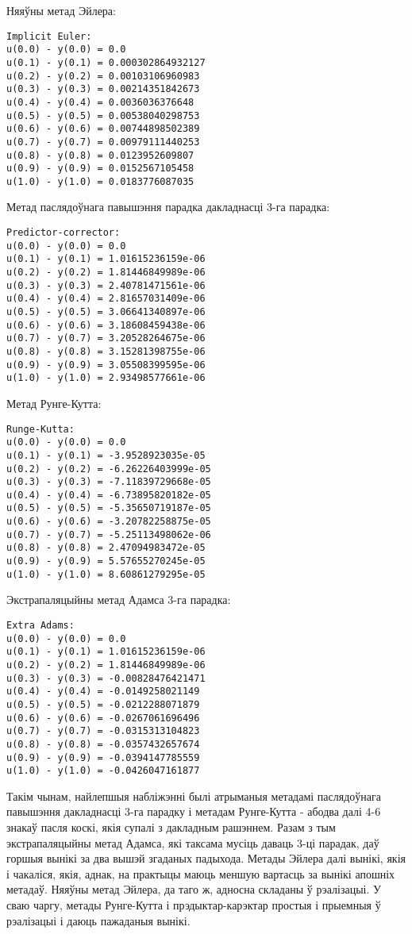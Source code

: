 Няяўны метад Эйлера:
{\small
\begin{verbatim}
Implicit Euler:
u(0.0) - y(0.0) = 0.0
u(0.1) - y(0.1) = 0.000302864932127
u(0.2) - y(0.2) = 0.00103106960983
u(0.3) - y(0.3) = 0.00214351842673
u(0.4) - y(0.4) = 0.0036036376648
u(0.5) - y(0.5) = 0.00538040298753
u(0.6) - y(0.6) = 0.00744898502389
u(0.7) - y(0.7) = 0.00979111440253
u(0.8) - y(0.8) = 0.0123952609807
u(0.9) - y(0.9) = 0.0152567105458
u(1.0) - y(1.0) = 0.0183776087035
\end{verbatim}
}

Метад паслядоўнага павышэння парадка дакладнасці 3-га парадка:
{\small
\begin{verbatim}
Predictor-corrector:
u(0.0) - y(0.0) = 0.0
u(0.1) - y(0.1) = 1.01615236159e-06
u(0.2) - y(0.2) = 1.81446849989e-06
u(0.3) - y(0.3) = 2.40781471561e-06
u(0.4) - y(0.4) = 2.81657031409e-06
u(0.5) - y(0.5) = 3.06641340897e-06
u(0.6) - y(0.6) = 3.18608459438e-06
u(0.7) - y(0.7) = 3.20528264675e-06
u(0.8) - y(0.8) = 3.15281398755e-06
u(0.9) - y(0.9) = 3.05508399595e-06
u(1.0) - y(1.0) = 2.93498577661e-06
\end{verbatim}
}

Метад Рунге-Кутта:
{\small
\begin{verbatim}
Runge-Kutta:
u(0.0) - y(0.0) = 0.0
u(0.1) - y(0.1) = -3.9528923035e-05
u(0.2) - y(0.2) = -6.26226403999e-05
u(0.3) - y(0.3) = -7.11839729668e-05
u(0.4) - y(0.4) = -6.73895820182e-05
u(0.5) - y(0.5) = -5.35650719187e-05
u(0.6) - y(0.6) = -3.20782258875e-05
u(0.7) - y(0.7) = -5.25113498062e-06
u(0.8) - y(0.8) = 2.47094983472e-05
u(0.9) - y(0.9) = 5.57655270245e-05
u(1.0) - y(1.0) = 8.60861279295e-05
\end{verbatim}
}

Экстрапаляцыйны метад Адамса 3-га парадка:
{\small
\begin{verbatim}
Extra Adams:
u(0.0) - y(0.0) = 0.0
u(0.1) - y(0.1) = 1.01615236159e-06
u(0.2) - y(0.2) = 1.81446849989e-06
u(0.3) - y(0.3) = -0.00828476421471
u(0.4) - y(0.4) = -0.0149258021149
u(0.5) - y(0.5) = -0.0212288071879
u(0.6) - y(0.6) = -0.0267061696496
u(0.7) - y(0.7) = -0.0315313104823
u(0.8) - y(0.8) = -0.0357432657674
u(0.9) - y(0.9) = -0.0394147785559
u(1.0) - y(1.0) = -0.0426047161877
\end{verbatim}
}

Такім чынам, найлепшыя набліжэнні былі атрыманыя метадамі паслядоўнага павышэння дакладнасці 3-га парадку і метадам Рунге-Кутта - абодва далі 4-6 знакаў пасля коскі, якія супалі з дакладным рашэннем. Разам з тым экстрапаляцыйны метад Адамса, які таксама мусіць даваць 3-ці парадак, даў горшыя вынікі за два вышэй згаданых падыхода. Метады Эйлера далі вынікі, якія і чакаліся, якія, аднак, на практыцы маюць меншую вартасць за вынікі апошніх метадаў. Няяўны метад Эйлера, да таго ж, адносна складаны ў рэалізацыі. У сваю чаргу, метады Рунге-Кутта і прэдыктар-карэктар простыя і прыемныя ў рэалізацыі і даюць пажаданыя вынікі.

